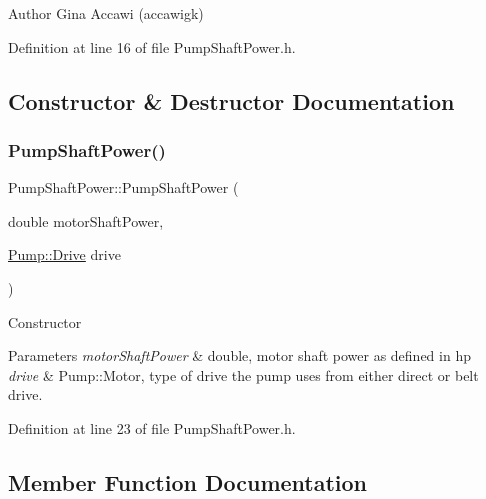 \begin{DoxyAuthor}{Author}
Gina Accawi (accawigk) 
\end{DoxyAuthor}


Definition at line 16 of file Pump\+Shaft\+Power.\+h.



\subsection{Constructor \& Destructor Documentation}
\mbox{\label{class_pump_shaft_power_a84d04978ce410d544a4c8d9eb393c92d}} 
\subsubsection{\texorpdfstring{Pump\+Shaft\+Power()}{PumpShaftPower()}}
{\footnotesize\ttfamily Pump\+Shaft\+Power\+::\+Pump\+Shaft\+Power (\begin{DoxyParamCaption}\item[{double}]{motor\+Shaft\+Power,  }\item[{\hyperlink{class_pump_a32bf0ade131a11bb3b3fb374f638e983}{Pump\+::\+Drive}}]{drive }\end{DoxyParamCaption})\hspace{0.3cm}{\ttfamily [inline]}}

Constructor 
\begin{DoxyParams}{Parameters}
{\em motor\+Shaft\+Power} & double, motor shaft power as defined in hp \\
\hline
{\em drive} & Pump\+::\+Motor, type of drive the pump uses from either direct or belt drive. \\
\hline
\end{DoxyParams}


Definition at line 23 of file Pump\+Shaft\+Power.\+h.



\subsection{Member Function Documentation}
\mbox{\label{class_pump_shaft_power_aad32bf26469a5f2984c85ba07c3f84d9}} 
